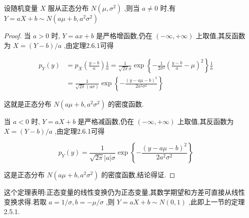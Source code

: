\begin{theorem}
	设随机变量 $ X $ 服从正态分布 $ N\left(\mu, \sigma^{2}\right) $ ,则当 $ a \neq 0 $ 时,有 $ Y= a X+b \sim N\left(a \mu+b, a^{2} \sigma^{2}\right) $ 
\end{theorem}

\begin{proof}
	当 $ a>0 $ 时, $ Y=ax+b $ 是严格增函数,仍在 $ (-\infty,+\infty) $ 上取值,其反函数为 $ X=(Y-b)/a $ ,由定理2.6.1可得
	
	\[
	\begin{aligned} p_{Y}(y) &=p_{X}\left(\frac{y-b}{a}\right) \frac{1}{a}=\frac{1}{\sqrt{2 \pi} \sigma} \exp \left\{-\frac{1}{2 \sigma^{2}}\left(\frac{y-b}{a}-\mu\right)^{2}\right\} \frac{1}{a} \\ &=\frac{1}{\sqrt{2 \pi}(a \sigma)} \exp \left\{-\frac{(y-a \mu-b)^{2}}{2 a^{2} \sigma^{2}}\right\} \end{aligned}
	\]
	
	这就是正态分布 $ N\left(a \mu+b, a^{2} \sigma^{2}\right) $ 的密度函数.
	
	当 $ a<0 $ 时, $ Y=aX+b $ 是严格减函数,仍在 $ (-\infty,+\infty) $ 上取值,其反函数为 $ X=(Y-b)/a $ ,由定理2.6.1可得
	
	\[
	p_{Y}(y)=\frac{1}{\sqrt{2 \pi}|a| \sigma} \exp \left\{-\frac{(y-a \mu-b)^{2}}{2 a^{2} \sigma^{2}}\right\}
	\]
	
	这是正态分布 $ N\left(a \mu+b, a^{2} \sigma^{2}\right) $ 的密度函数,结论得证.
	
\end{proof}

这个定理表明:正态变量的线性变换仍为正态变量,其数学期望和方差可直接从线性变换求得.若取 $ a=1 / \sigma, b=-\mu / \sigma $ ,则 $ Y=a X+b \sim N(0,1) $ ,此即上一节的定理2.5.1.

